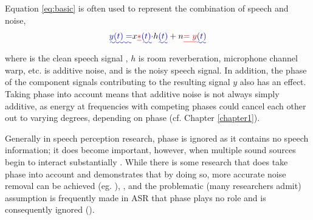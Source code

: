 Equation \ref{eq:basic} is often used to represent the combination of speech and noise,
\begin{equation}\label{eq:basic}
\DIFaddbegin \DIFadd{y(t) = }\DIFaddend x\DIFdelbegin \DIFdel{* }\DIFdelend \DIFaddbegin \DIFadd{(t) \cdot }\DIFaddend h\DIFaddbegin \DIFadd{(t) }\DIFaddend + n\DIFdelbegin \DIFdel{= y
}\DIFdelend \DIFaddbegin \DIFadd{(t)
}\DIFaddend \end{equation}
where \DIFdelbegin {}\DIFdelend \DIFaddbegin {}\DIFaddend is the clean speech signal \DIFaddbegin {}\DIFaddend , $h$ is \DIFdelbegin {}\DIFdelend \DIFaddbegin {}\DIFaddend room reverberation, microphone channel warp, etc. \DIFdelbegin {}\DIFdelend \DIFaddbegin {}\DIFaddend is additive noise, and \DIFdelbegin {}\DIFdelend \DIFaddbegin {}\DIFaddend is the noisy speech signal\DIFaddbegin {}\DIFaddend .  In addition, the phase of the component signals contributing to the resulting signal $y$ also has an effect.  Taking phase into account means that additive noise is not always simply additive, as energy at frequencies with competing phases could cancel each other out to varying degrees, depending on phase (cf. Chapter \ref{chapter1}).  

Generally in speech perception research, phase is ignored as it contains no speech information; it does become important, however, when multiple sound sources begin to interact substantially \DIFaddbegin {}\DIFaddend .  While there is some research that does take phase into account and demonstrates that by doing so, more accurate noise removal can be achieved (eg. \cite{deng:04,leutnant:09}), \DIFdelbegin {}\DIFdelend \DIFaddbegin {}\DIFaddend , and the problematic (many researchers admit) assumption is frequently made in ASR that phase plays no role and is consequently ignored (\cite{li:14}).  

